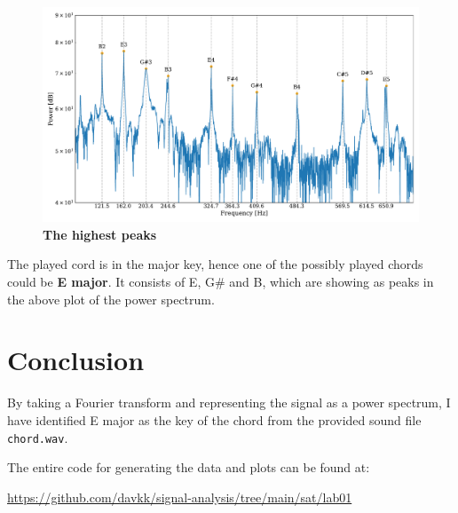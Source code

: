 \documentclass[13pt,a4paper]{article}
\begin{document}
\begin{figure}[ht!]
    \centering
    \caption{\textbf{The highest peaks}}
    \includegraphics[width=1\textwidth]{peaks.pdf}
\end{figure}

The played cord is in the major key, hence one of the possibly played chords could be \textbf{E major}. It consists of E, G\# and B, which are showing as peaks in the above plot of the power spectrum.


\section{Conclusion}

By taking a Fourier transform and representing the signal as a power spectrum, I have identified E major as the key of the chord from the provided sound file \verb|chord.wav|.

The entire code for generating the data and plots can be found at:

\url{https://github.com/davkk/signal-analysis/tree/main/sat/lab01}
\end{document}
